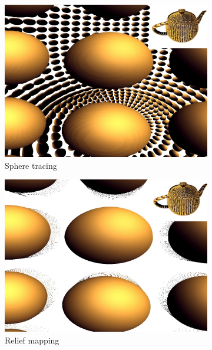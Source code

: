 \begin{figure}
\begin{fullwidth}
\begin{subfigure}[b]{0.1758\thewidth}
	\end{subfigure}
	\begin{subfigure}[b]{0.202\thewidth}
		\includegraphics[width=\textwidth]{graphics/df/ddm-sphere-tracing-1}	
		\caption{Sphere tracing}
	\end{subfigure}
	\begin{subfigure}[b]{0.202\thewidth}
		\includegraphics[width=\textwidth]{graphics/df/ddm-relief-mapping}
		\caption{Relief mapping}
	\end{subfigure}
	\begin{subfigure}[b]{0.202\thewidth}

\end{subfigure}
\end{fullwidth}
\end{figure}
